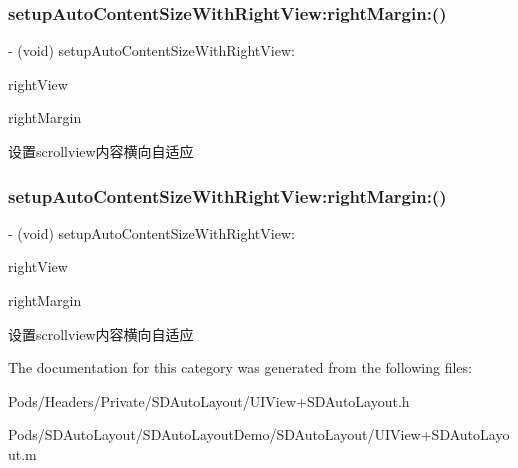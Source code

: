 \subsubsection{\texorpdfstring{setup\+Auto\+Content\+Size\+With\+Right\+View\+:right\+Margin\+:()}{setupAutoContentSizeWithRightView:rightMargin:()}\hspace{0.1cm}{\footnotesize\ttfamily [2/3]}}
{\footnotesize\ttfamily -\/ (void) setup\+Auto\+Content\+Size\+With\+Right\+View\+: \begin{DoxyParamCaption}\item[{(U\+I\+View $\ast$)}]{right\+View }\item[{rightMargin:(C\+G\+Float)}]{right\+Margin }\end{DoxyParamCaption}}

设置scrollview内容横向自适应 \mbox{\label{category_u_i_scroll_view_07_s_d_auto_content_size_08_aa406237a7ba0260904d7c9008635bbe7}} 
\subsubsection{\texorpdfstring{setup\+Auto\+Content\+Size\+With\+Right\+View\+:right\+Margin\+:()}{setupAutoContentSizeWithRightView:rightMargin:()}\hspace{0.1cm}{\footnotesize\ttfamily [3/3]}}
{\footnotesize\ttfamily -\/ (void) setup\+Auto\+Content\+Size\+With\+Right\+View\+: \begin{DoxyParamCaption}\item[{(U\+I\+View $\ast$)}]{right\+View }\item[{rightMargin:(C\+G\+Float)}]{right\+Margin }\end{DoxyParamCaption}}

设置scrollview内容横向自适应 

The documentation for this category was generated from the following files\+:\begin{DoxyCompactItemize}
\item 
Pods/\+Headers/\+Private/\+S\+D\+Auto\+Layout/U\+I\+View+\+S\+D\+Auto\+Layout.\+h\item 
Pods/\+S\+D\+Auto\+Layout/\+S\+D\+Auto\+Layout\+Demo/\+S\+D\+Auto\+Layout/U\+I\+View+\+S\+D\+Auto\+Layout.\+m\end{DoxyCompactItemize}
